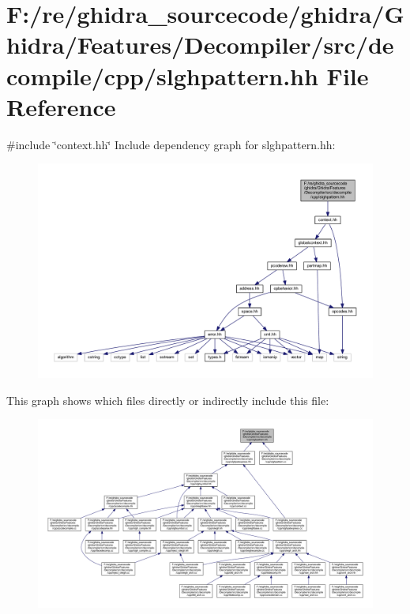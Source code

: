 \hypertarget{slghpattern_8hh}{}\section{F\+:/re/ghidra\+\_\+sourcecode/ghidra/\+Ghidra/\+Features/\+Decompiler/src/decompile/cpp/slghpattern.hh File Reference}
\label{slghpattern_8hh}
{\ttfamily \#include \char`\"{}context.\+hh\char`\"{}}\newline
Include dependency graph for slghpattern.\+hh\+:
\nopagebreak
\begin{figure}[H]
\begin{center}
\leavevmode
\includegraphics[width=350pt]{slghpattern_8hh__incl}
\end{center}
\end{figure}
This graph shows which files directly or indirectly include this file\+:
\nopagebreak
\begin{figure}[H]
\begin{center}
\leavevmode
\includegraphics[width=350pt]{slghpattern_8hh__dep__incl}
\end{center}
\end{figure}
